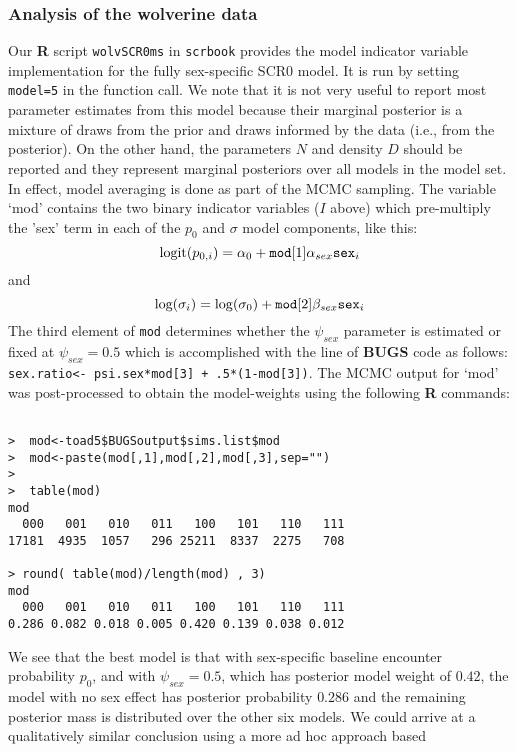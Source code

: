 \subsubsection{Analysis of the wolverine data}

Our {\bf R} script \mbox{\tt wolvSCR0ms} in \mbox{\tt scrbook}
provides the model indicator variable implementation for the fully
sex-specific SCR0 model.  It is run by setting \mbox{\tt model=5} in
the function call. We note that it is not very useful to report most
parameter estimates from this model because their marginal posterior
is a mixture of %
draws from the prior and draws %
informed by
the data (i.e., from the posterior). On the other hand, the parameters
$N$ and density $D$ should be reported and they represent marginal
posteriors over all models in the model set. In effect, model
averaging is done as part of the MCMC sampling.  The variable `mod'
contains the two binary indicator variables ($I$ above) which
pre-multiply the 'sex' term in each of the $p_{0}$ and $\sigma$ model
components, like this:
\[
 \mbox{logit}(p_{0,i}) = \alpha_{0} + \mbox{\tt mod}[1] \alpha_{sex} \mbox{\tt sex}_{i}
\]
and
\[
 \mbox{log}(\sigma_{i}) = \log(\sigma_{0}) + \mbox{\tt mod}[2] \beta_{sex} \mbox{\tt sex}_{i}
\]
The third element of \mbox{\tt mod} determines whether the
$\psi_{sex}$ parameter is estimated or fixed at $\psi_{sex} =
0.5$ which is accomplished with the line of {\bf BUGS} code as follows:
\mbox{\tt sex.ratio<- psi.sex*mod[3] + .5*(1-mod[3])}.
The MCMC output for `mod' was post-processed to obtain the
model-weights using the following  {\bf R} commands:
\begin{verbatim}

>  mod<-toad5$BUGSoutput$sims.list$mod
>  mod<-paste(mod[,1],mod[,2],mod[,3],sep="")
>
>  table(mod)
mod
  000   001   010   011   100   101   110   111
17181  4935  1057   296 25211  8337  2275   708

> round( table(mod)/length(mod) , 3)
mod
  000   001   010   011   100   101   110   111
0.286 0.082 0.018 0.005 0.420 0.139 0.038 0.012

\end{verbatim}
We see that the best model is that with sex-specific baseline
encounter probability $p_{0}$, and with $\psi_{sex} = 0.5$, which has
posterior model weight of $0.42$, the model with no sex effect has
posterior probability $0.286$ and the remaining posterior mass is
distributed over the other six models. We could arrive at a
qualitatively similar conclusion using a more ad hoc approach based
